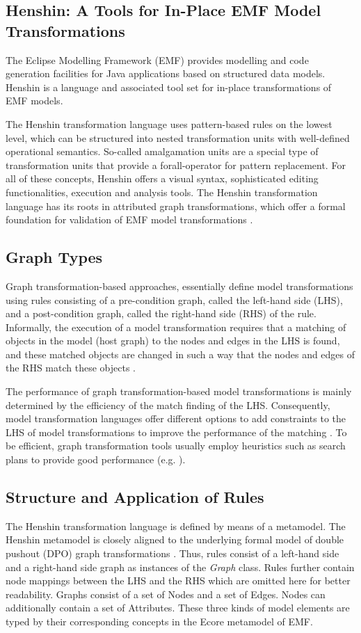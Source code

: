 \subsection*{Henshin: A Tools for In-Place EMF Model Transformations}\label{henshin}
The Eclipse Modelling Framework (EMF) provides modelling and code generation facilities for Java applications based on structured data models. Henshin is a language and associated tool set for in-place transformations of EMF models. 

The Henshin transformation language uses pattern-based rules on the lowest level, which can be structured into nested transformation units with well-defined operational semantics. So-called amalgamation units are a special type of transformation units that provide a forall-operator for pattern replacement. For all of these concepts, Henshin offers a visual syntax, sophisticated editing functionalities, execution and analysis tools. The Henshin transformation language has its roots in attributed graph transformations, which offer a formal foundation for validation of EMF model transformations \cite{arendt2010henshin}.
\subsection*{Graph Types}
Graph transformation-based approaches, essentially define model transformations using rules consisting of a pre-condition graph, called the left-hand side (LHS), and a post-condition graph, called the right-hand side (RHS) of the rule. Informally, the execution of a model transformation requires that a matching of objects in the model (host graph) to the nodes and edges in the LHS is found, and these matched objects are changed in such a way that the nodes and edges of the RHS match these objects \cite{tichy2013detecting}.

The performance of graph transformation-based model transformations is mainly determined by the eﬃciency of the match finding of the LHS. Consequently, model transformation languages offer different options to add constraints to the LHS of model transformations to improve the performance of the matching \cite{tichy2013detecting}. To be eﬃcient, graph transformation tools usually employ heuristics such as search plans to provide good performance (e.g. \cite{varro2012algorithm}).
\subsection*{Structure and Application of Rules}
The Henshin transformation language is defined by means of a metamodel. The Henshin metamodel is closely aligned to the underlying formal model of double pushout (DPO) graph transformations \cite{tichy2013detecting}. Thus, rules consist of a left-hand side and a right-hand side graph as instances of the \emph{Graph} class. Rules further contain node mappings between the LHS and the RHS which are omitted here for better readability. Graphs consist of a set of Nodes and a set of Edges. Nodes can additionally contain a set of Attributes. These three kinds of model elements are typed by their corresponding concepts in the Ecore metamodel of EMF.
